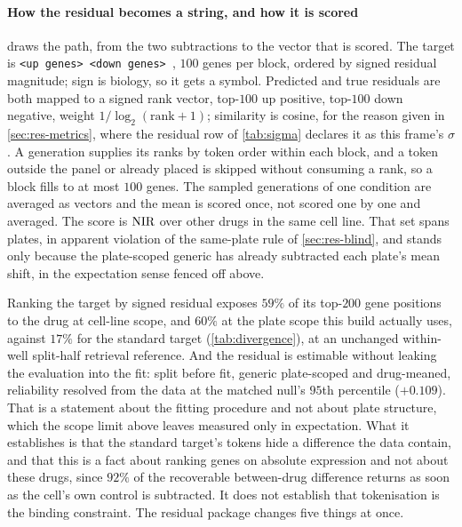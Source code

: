 \paragraph{How the residual becomes a string, and how it is scored}
 draws the path, from the two subtractions to the vector that is
scored. The target is \texttt{<up genes> \DOWN{} <down genes> \ENDCELL}, $100$
genes per block, ordered by signed residual magnitude; sign is biology, so it
gets a symbol.
Predicted and true residuals are both mapped to a signed rank vector, top-$100$
up positive, top-$100$ down negative, weight $1/\log_2(\textrm{rank}+1)$;
similarity is cosine, for the reason given in \cref{sec:res-metrics}, where the
residual row of \cref{tab:sigma} declares it as this frame's $\sigma$.
A generation supplies its ranks by token order within each
block, and a token outside the panel or already placed is skipped without
consuming a rank, so a block fills to at most $100$ genes. The sampled
generations of one condition are averaged as vectors and the mean is scored
once, not scored one by one and averaged.
The score is $\textrm{NIR}$ over other drugs in the same cell line. That set
spans plates, in apparent violation of the same-plate rule of
\cref{sec:res-blind}, and stands only because the plate-scoped generic has
already subtracted each plate's mean shift, in the expectation sense fenced
off above.



%
\begin{claim}
Ranking the target by signed residual exposes $59\%$ of its top-$200$ gene
positions to the drug at cell-line scope, and $60\%$ at the plate scope this
build actually uses, against $17\%$ for the standard target
(\cref{tab:divergence}), at an unchanged within-well split-half retrieval
reference. And the residual is estimable without leaking the evaluation into the
fit: split before fit, generic plate-scoped and drug-meaned, reliability resolved
from the data at the matched null's $95$th percentile ($+0.109$). That is a
statement about the fitting procedure and not about plate structure, which the
scope limit above leaves measured only in expectation. What it establishes is
that the standard target's tokens hide a difference the data contain, and that
this is a fact about ranking genes on absolute expression and not about these
drugs, since $92\%$ of the recoverable between-drug difference returns as soon as
the cell's own control is subtracted. It does not establish that tokenisation is
the binding constraint. The residual package changes five things at once.
\end{claim}

